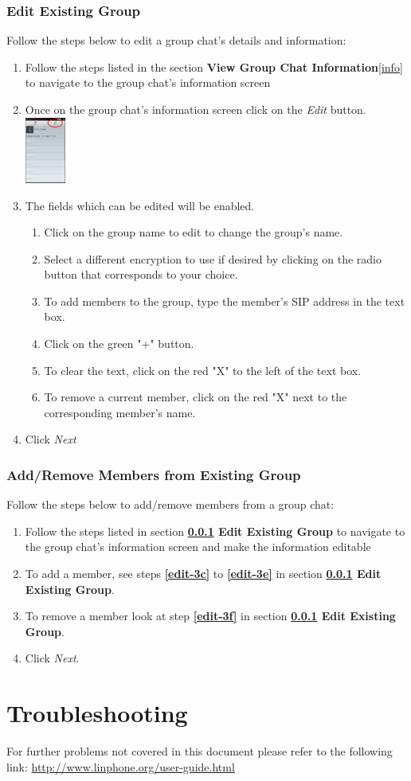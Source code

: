 \documentclass[11pt]{article}
\begin{document}
\subsubsection{Edit Existing Group}  \label{edit}
Follow the steps below to edit a group chat's details and information:
\begin{enumerate}
\item Follow the steps listed in the section \textbf{View Group Chat Information}\ref{info} to navigate to the group chat's information screen
\item Once on the group chat's information screen click on the \textit{Edit} button.\\
\includegraphics[width=50px]{images/groupchatInfoEdit.png}
\item The fields which can be edited will be enabled.
\begin{enumerate}
\item Click on the group name to edit to change the group's name.
\item Select a different encryption to use if desired by clicking on the radio button that corresponds to your choice.
\item To add members to the group, type the member's SIP address in the text box.\label{edit-3c}
\item Click on the green "+" button.
\item To clear the text, click on the red "X" to the left of the text box.\label{edit-3e}
\item To remove a current member, click on the red "X" next to the corresponding member's name.\label{edit-3f}
\end{enumerate}
\item Click \textit{Next}
\end{enumerate}


\subsubsection{Add/Remove Members from Existing Group}  \label{add}
Follow the steps below to add/remove members from a group chat:
\begin{enumerate}
\item Follow the steps listed in section \textbf{\ref{edit} Edit Existing Group} to navigate to the group chat's information screen and make the information editable
\item To add a member, see steps \textbf{\ref{edit-3c}} to \textbf{\ref{edit-3e}} in section \textbf{\ref{edit} Edit Existing Group}.
\item To remove a member look at step \textbf{\ref{edit-3f}} in section \textbf{\ref{edit} Edit Existing Group}.
\item Click \textit{Next}.
\end{enumerate}


\section{Troubleshooting}

For further problems not covered in this document please refer to the following link:
\url{http://www.linphone.org/user-guide.html}
\end{document}
